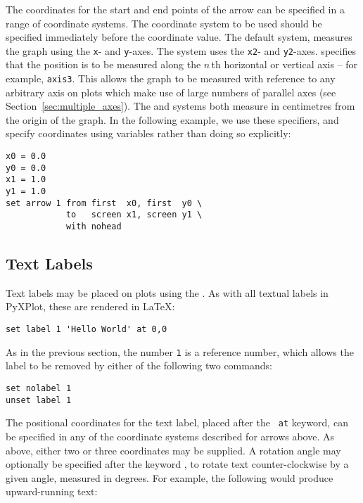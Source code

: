 The coordinates for the start and end points of the arrow can be specified in a
range of coordinate systems. The coordinate system to be used should be
specified immediately before the coordinate value. The default system,
 measures the graph using the {\tt x}- and {\tt y}-axes. The
 system uses the {\tt x2}- and {\tt y2}-axes. 
specifies that the position is to be measured along the $n\,$th horizontal or
vertical axis -- for example, {\tt axis3}. This allows the
graph to be measured with reference to any arbitrary axis on plots which make
use of large numbers of parallel axes (see Section~\ref{sec:multiple_axes}).
The  and  systems both measure in centimetres from
the origin of the graph. In the following example, we use these specifiers, and
specify coordinates using variables rather than doing so explicitly:

\begin{verbatim}
x0 = 0.0
y0 = 0.0
x1 = 1.0
y1 = 1.0
set arrow 1 from first  x0, first  y0 \
            to   screen x1, screen y1 \
            with nohead
\end{verbatim}

\subsection{Text Labels}

Text labels may be placed on plots using the . As with all
textual labels in PyXPlot, these are rendered in \LaTeX:

\begin{verbatim}
set label 1 'Hello World' at 0,0
\end{verbatim}

As in the previous section, the number {\tt 1} is a reference number, which
allows the label to be removed by either of the following two commands:

\begin{verbatim}
set nolabel 1
unset label 1
\end{verbatim}

\noindent The positional coordinates for the text label, placed after the {\tt
at} keyword, can be specified in any of the coordinate systems described for
arrows above. As above, either two or three coordinates may be supplied. A
rotation angle may optionally be specified after the keyword \indkeyt{rotate},
to rotate text counter-clockwise by a given angle, measured in degrees. For
example, the following would produce upward-running text:

